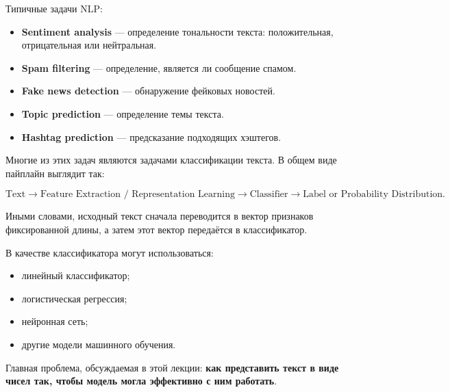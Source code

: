 \documentclass[a4paper,12pt]{article}
\begin{document}
Типичные задачи NLP:

\begin{itemize}
    \item \textbf{Sentiment analysis} --- определение тональности текста: положительная, отрицательная или нейтральная.
    \item \textbf{Spam filtering} --- определение, является ли сообщение спамом.
    \item \textbf{Fake news detection} --- обнаружение фейковых новостей.
    \item \textbf{Topic prediction} --- определение темы текста.
    \item \textbf{Hashtag prediction} --- предсказание подходящих хэштегов.
\end{itemize}

Многие из этих задач являются задачами классификации текста. В общем виде пайплайн выглядит так:

\[
\text{Text}
\longrightarrow
\text{Feature Extraction / Representation Learning}
\longrightarrow
\text{Classifier}
\longrightarrow
\text{Label or Probability Distribution}.
\]

Иными словами, исходный текст сначала переводится в вектор признаков фиксированной длины, а затем этот вектор передаётся в классификатор.

%

В качестве классификатора могут использоваться:

\begin{itemize}
    \item линейный классификатор;
    \item логистическая регрессия;
    \item нейронная сеть;
    \item другие модели машинного обучения.
\end{itemize}

Главная проблема, обсуждаемая в этой лекции: \textbf{как представить текст в виде чисел так, чтобы модель могла эффективно с ним работать}.
\end{document}
